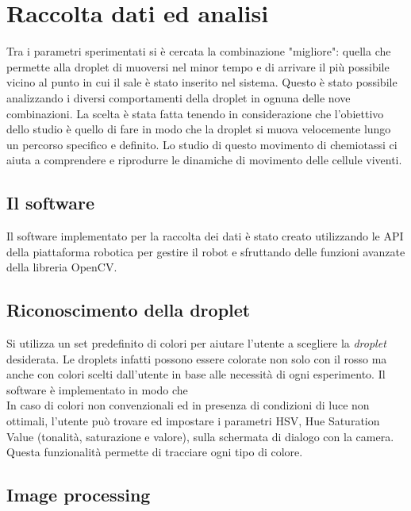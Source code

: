 \chapter{Raccolta dati ed analisi}
\vspace{0.5cm}
\label{cha:789}

Tra i parametri sperimentati si è cercata la combinazione "migliore": quella che permette alla droplet di muoversi nel minor tempo e di arrivare il più possibile vicino al punto in cui il sale è stato inserito nel sistema. Questo è stato possibile analizzando i diversi comportamenti della droplet in ognuna delle nove combinazioni. La scelta è stata fatta tenendo in considerazione che l'obiettivo dello studio è quello di fare in modo che la droplet si muova velocemente lungo un percorso specifico e definito. Lo studio di questo movimento di chemiotassi ci aiuta a comprendere e riprodurre le dinamiche di movimento delle cellule viventi. 

\section{Il software}
Il software implementato per la raccolta dei dati è stato creato utilizzando le API della piattaforma robotica per gestire il robot e sfruttando delle funzioni avanzate della libreria OpenCV.  



\section{Riconoscimento della droplet}
Si utilizza un set predefinito di colori per aiutare l'utente a scegliere la \emph{droplet} desiderata. Le droplets infatti possono essere colorate non solo con il rosso ma anche con colori scelti dall'utente in base alle necessità di ogni esperimento. 
Il software è implementato in modo che 
\\In caso di colori non convenzionali ed in presenza di condizioni di luce non ottimali, l'utente può trovare ed impostare i parametri HSV, Hue Saturation Value (tonalità, saturazione e valore), sulla schermata di dialogo con la camera. Questa funzionalità permette di tracciare ogni tipo di colore. 



\section{Image processing}
\label{sec:456}


